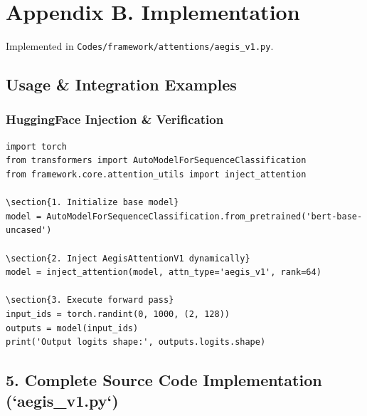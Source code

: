 \section*{Appendix B. Implementation}Implemented in \texttt{Codes/framework/attentions/aegis\_v1.py}.



\subsection{Usage \& Integration Examples}
\subsubsection{HuggingFace Injection \& Verification}

\begin{lstlisting}
import torch
from transformers import AutoModelForSequenceClassification
from framework.core.attention_utils import inject_attention

\section{1. Initialize base model}
model = AutoModelForSequenceClassification.from_pretrained('bert-base-uncased')

\section{2. Inject AegisAttentionV1 dynamically}
model = inject_attention(model, attn_type='aegis_v1', rank=64)

\section{3. Execute forward pass}
input_ids = torch.randint(0, 1000, (2, 128))
outputs = model(input_ids)
print('Output logits shape:', outputs.logits.shape)
\end{lstlisting}



\subsection{5. Complete Source Code Implementation (`aegis_v1.py`)}

